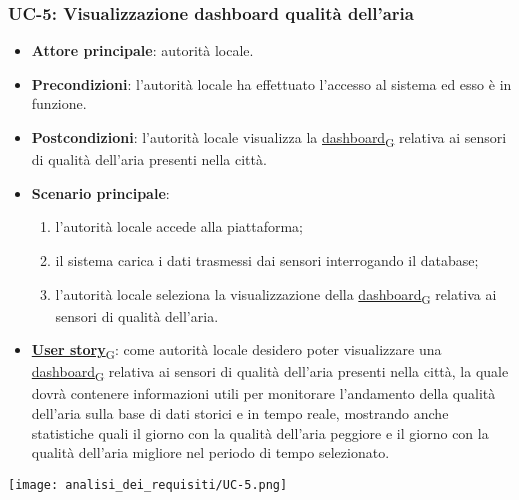\subsubsection{UC-5: Visualizzazione dashboard qualità dell'aria}
\begin{itemize}
	\item \textbf{Attore principale}: autorità locale.
	\item \textbf{Precondizioni}: l'autorità locale ha effettuato l'accesso al sistema ed esso è in funzione.
	\item \textbf{Postcondizioni}: l'autorità locale visualizza la \href{https://7last.github.io/docs/rtb/documentazione-interna/glossario\#dashboard}{dashboard\textsubscript{G}} relativa
	      ai sensori di qualità dell'aria presenti nella città.
	\item \textbf{Scenario principale}:
	      \begin{enumerate}
		      \item l'autorità locale accede alla piattaforma;
		      \item il sistema carica i dati trasmessi dai sensori interrogando il database;
		      \item l'autorità locale seleziona la visualizzazione della \href{https://7last.github.io/docs/rtb/documentazione-interna/glossario\#dashboard}{dashboard\textsubscript{G}} relativa ai sensori di qualità dell'aria.
	      \end{enumerate}
	\item \href{https://7last.github.io/docs/rtb/documentazione-interna/glossario\#user-story}{\textbf{User story}\textsubscript{G}}:
	      come autorità locale desidero poter visualizzare una \href{https://7last.github.io/docs/rtb/documentazione-interna/glossario\#dashboard}{dashboard\textsubscript{G}} relativa ai sensori di qualità dell'aria presenti nella città, la quale
	      dovrà contenere informazioni utili per monitorare l'andamento della qualità dell'aria sulla base di dati storici e in tempo reale, mostrando
	      anche statistiche quali il giorno con la qualità dell'aria peggiore e il giorno con la qualità dell'aria migliore nel periodo di tempo selezionato.
\end{itemize}
\begin{center}
	\texttt{[image: analisi\_dei\_requisiti/UC-5.png]}
\end{center}

